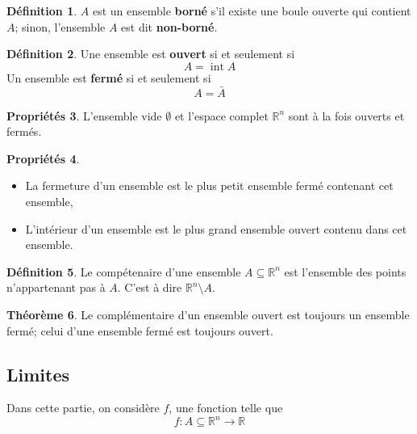 \documentclass[11pt,a4paper]{article}
\theoremstyle{definition}
\newtheorem{mydef}{Définition}%
\newtheorem{myprop}[mydef]{Propriétés}
\newtheorem{mytheo}[mydef]{Théorème}
\DeclareMathOperator{\newint}{int}
\newcommand{\R}{\mathbb{R}}
\newcommand{\Rn}{\R^n}
\newcommand*\InsertTheoremBreak{%
	\begingroup %
		\setlength\itemsep{0pt}%
		\setlength\parsep{0pt}%
		\item[\vbox{\null}]%
	\endgroup%
}%
\begin{document}
\begin{mydef}
	$A$ est un ensemble \textbf{borné} s'il existe une boule ouverte qui contient $A$;
	sinon, l'ensemble $A$ est dit \textbf{non-borné}.
\end{mydef}

\begin{mydef}
	Une ensemble est \textbf{ouvert} si et seulement si
	\[ A = \newint A \]
	Un ensemble est \textbf{fermé} si et seulement si
	\[ A = \bar{A} \]
\end{mydef}

\begin{myprop}
	L'ensemble vide $\emptyset$ et l'espace complet $\Rn$ sont à la fois ouverts et fermés.
\end{myprop}

\begin{myprop}\InsertTheoremBreak
	\begin{itemize}
		\item La fermeture d'un ensemble est le plus petit ensemble fermé contenant cet ensemble,
		\item L'intérieur d'un ensemble est le plus grand ensemble ouvert contenu dans cet ensemble.
	\end{itemize}
\end{myprop}

\begin{mydef}
	Le compétenaire d'une ensemble $A \subseteq \Rn$ est l'ensemble des points n'appartenant pas à $A$.
	C'est à dire $\Rn \setminus A$.
\end{mydef}

\begin{mytheo}
	Le complémentaire d'un ensemble ouvert est toujours un ensemble fermé;
	celui d'une ensemble fermé est toujours ouvert.
\end{mytheo}

\subsection{Limites}

Dans cette partie, on considère $f$, une fonction telle que
\[ f : A \subseteq \R^n \to \R \]
\end{document}
